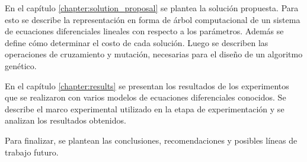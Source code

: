 En el capítulo \ref{chapter:solution_proposal} se plantea la solución propuesta. Para esto se describe la representación en forma de árbol computacional de un sistema de ecuaciones diferenciales lineales con respecto a los parámetros. Además se define cómo determinar el costo de cada solución. Luego se describen las operaciones de cruzamiento y mutación, necesarias para el diseño de un algoritmo genético.

En el capítulo \ref{chapter:results} se presentan los resultados de los experimentos que se realizaron con varios modelos de ecuaciones diferenciales conocidos. Se describe el marco experimental utilizado en la etapa de experimentación y se analizan los resultados obtenidos.

Para finalizar, se plantean las conclusiones, recomendaciones y posibles líneas de trabajo futuro.